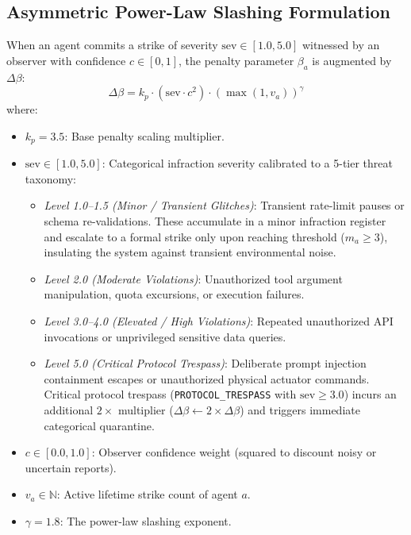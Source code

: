 \documentclass[journal]{IEEEtran}
\begin{document}
\subsection{Asymmetric Power-Law Slashing Formulation}
When an agent commits a strike of severity $\text{sev} \in [1.0, 5.0]$ witnessed by an observer with confidence $c \in [0, 1]$, the penalty parameter $\beta_a$ is augmented by $\Delta\beta$:
\begin{equation}
\Delta\beta = k_p \cdot (\text{sev} \cdot c^2) \cdot (\max(1, v_a))^{\gamma}
\label{eq:power_law}
\end{equation}
where:
\begin{itemize}[leftmargin=12pt, topsep=2pt, itemsep=1pt]
\item $k_p = 3.5$: Base penalty scaling multiplier.
\item $\text{sev} \in [1.0, 5.0]$: Categorical infraction severity calibrated to a 5-tier threat taxonomy:
  \begin{itemize}[leftmargin=8pt, topsep=1pt, itemsep=0pt]
  \item \emph{Level 1.0--1.5 (Minor / Transient Glitches)}: Transient rate-limit pauses or schema re-validations. These accumulate in a minor infraction register and escalate to a formal strike only upon reaching threshold ($m_a \ge 3$), insulating the system against transient environmental noise.
  \item \emph{Level 2.0 (Moderate Violations)}: Unauthorized tool argument manipulation, quota excursions, or execution failures.
  \item \emph{Level 3.0--4.0 (Elevated / High Violations)}: Repeated unauthorized API invocations or unprivileged sensitive data queries.
  \item \emph{Level 5.0 (Critical Protocol Trespass)}: Deliberate prompt injection containment escapes or unauthorized physical actuator commands. Critical protocol trespass (\texttt{PROTOCOL\_TRESPASS} with $\text{sev} \ge 3.0$) incurs an additional $2\times$ multiplier ($\Delta\beta \leftarrow 2 \times \Delta\beta$) and triggers immediate categorical quarantine.
  \end{itemize}
\item $c \in [0.0, 1.0]$: Observer confidence weight (squared to discount noisy or uncertain reports).
\item $v_a \in \mathbb{N}$: Active lifetime strike count of agent $a$.
\item $\gamma = 1.8$: The power-law slashing exponent.
\end{itemize}
\end{document}
